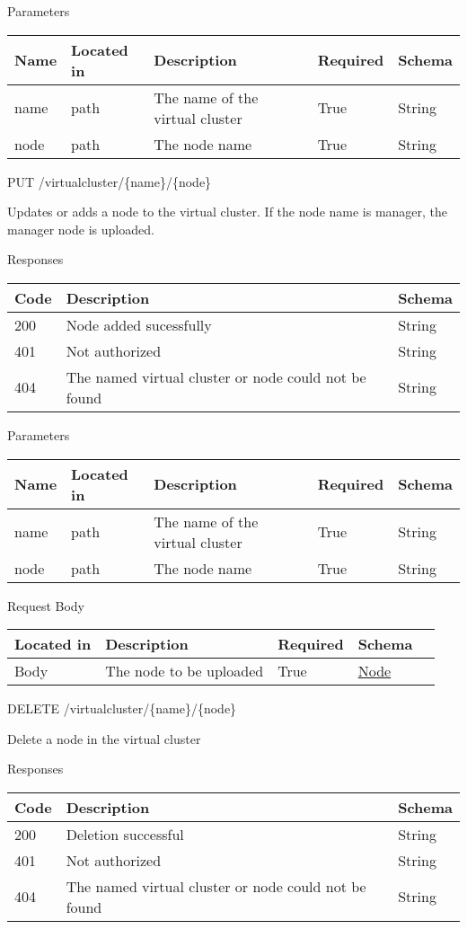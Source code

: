 Parameters

\begin{longtable}[]{@{}p{}p{}p{}p{}p{}@{}}
\toprule
Name & Located in & Description & Required & Schema\tabularnewline
\midrule
\endhead
name & path & The name of the virtual cluster & True &
String\tabularnewline
node & path & The node name & True & String\tabularnewline
\bottomrule
\end{longtable}

PUT /virtualcluster/\{name\}/\{node\}

Updates or adds a node to the virtual cluster. If the node name is
manager, the manager node is uploaded.

Responses

\begin{longtable}[]{@{}p{}p{}p{}@{}}
\toprule
Code & Description & Schema\tabularnewline
\midrule
\endhead
200 & Node added sucessfully & String\tabularnewline
401 & Not authorized & String\tabularnewline
404 & The named virtual cluster or node could not be found &
String\tabularnewline
\bottomrule
\end{longtable}

Parameters

\begin{longtable}[]{@{}p{}p{}p{}p{}p{}@{}}
\toprule
Name & Located in & Description & Required & Schema\tabularnewline
\midrule
\endhead
name & path & The name of the virtual cluster & True &
String\tabularnewline
node & path & The node name & True & String\tabularnewline
\bottomrule
\end{longtable}

Request Body

\begin{longtable}[]{@{}p{}p{}p{}p{}p{}@{}}
\toprule
Located in & Description & Required & Schema &\tabularnewline
\midrule
\endhead
Body & The node to be uploaded & True & \protect\hyperlink{node}{Node}
&\tabularnewline
\bottomrule
\end{longtable}

DELETE /virtualcluster/\{name\}/\{node\}

Delete a node in the virtual cluster

Responses

\begin{longtable}[]{@{}p{}p{}p{}@{}}
\toprule
Code & Description & Schema\tabularnewline
\midrule
\endhead
200 & Deletion successful & String\tabularnewline
401 & Not authorized & String\tabularnewline
404 & The named virtual cluster or node could not be found &
String\tabularnewline
\bottomrule
\end{longtable}

